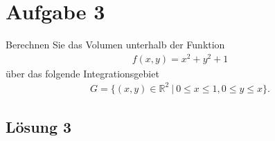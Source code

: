 \documentclass[main.tex]{subfiles}
\begin{document}
\section{Aufgabe 3}
Berechnen Sie das Volumen unterhalb der Funktion
\begin{align*}
    f(x,y) = x^2 + y^2 + 1
\end{align*}
über das folgende Integrationsgebiet 
\begin{align*}
    G = \{ (x,y) \in \mathbb{R}^2 \ | \ 0 \leq x \leq 1, 0 \leq y \leq x \}.
\end{align*}

\subsection{Lösung 3}
\end{document}
